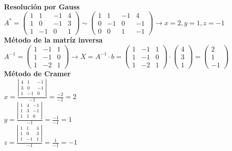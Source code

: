 \documentclass[addpoints,spanish, 12pt,a4paper]{exam}
\begin{document}
\begin{questions}
\begin{solution}
\\ \textbf{Resolución por Gauss} \\ $A^*=\left(\begin{matrix}1 & 1 & -1 & 4\\1 & 0 & -1 & 3\\1 & -1 & 0 & 1\end{matrix}\right)\sim\left(\begin{matrix}1 & 1 & -1 & 4\\0 & -1 & 0 & -1\\0 & 0 & 1 & -1\end{matrix}\right)\to x=2, y=1, z=-1$ \\ \textbf{Método de la matríz inversa} \\ $A^{-1}=\left(\begin{matrix}1 & -1 & 1\\1 & -1 & 0\\1 & -2 & 1\end{matrix}\right) \to  X=A^{-1}\cdot b =\left(\begin{matrix}1 & -1 & 1\\1 & -1 & 0\\1 & -2 & 1\end{matrix}\right)\cdot \left(\begin{matrix}4\\3\\1\end{matrix}\right) =\left(\begin{matrix}2\\1\\-1\end{matrix}\right)$ \\ \textbf{Método de Cramer} \\ $x=\frac{\left|\begin{matrix}4 & 1 & -1\\3 & 0 & -1\\1 & -1 & 0\end{matrix}\right|}{-1}=\frac{-2}{-1}=2$ \\ $y=\frac{\left|\begin{matrix}1 & 4 & -1\\1 & 3 & -1\\1 & 1 & 0\end{matrix}\right|}{-1}=\frac{-1}{-1}=1$ \\ $z=\frac{\left|\begin{matrix}1 & 1 & 4\\1 & 0 & 3\\1 & -1 & 1\end{matrix}\right|}{-1}=\frac{1}{-1}=-1$
\end{solution}


\end{questions}
\end{document}
